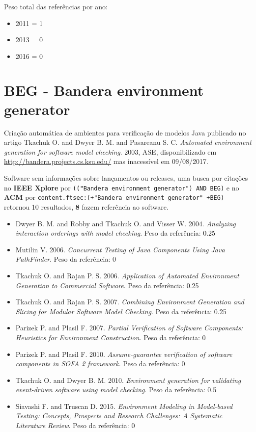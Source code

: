 Peso total das referências por ano:

\begin{itemize}
\item 2011 = 1
\item 2013 = 0
\item 2016 = 0
\end{itemize}


\section{BEG - Bandera environment generator}

Criação automática de ambientes para verificação de modelos Java
publicado no artigo
Tkachuk O. and Dwyer B. M. and Pasareanu S. C.
{\it Automated environment generation for software model checking}.
2003,
ASE,
disponibilizado em \url{http://bandera.projects.cs.ksu.edu/}
mas inacessível em 09/08/2017.

Software sem informações sobre lançamentos ou releases,
uma busca por citações no {\bf IEEE Xplore} por
\texttt{(("Bandera environment generator") AND BEG)}
e no {\bf ACM} por
\texttt{content.ftsec:(+"Bandera environment generator" +BEG)}
retornou
10 resultados,
{\bf 8} fazem referência ao software.

\begin{itemize}
\item Dwyer B. M. and Robby and Tkachuk O. and Visser W.
      2004.
      {\it Analyzing interaction orderings with model checking}.
      Peso da referência: 0.25
\item Mutilin V.
      2006.
      {\it Concurrent Testing of Java Components Using Java PathFinder}.
      Peso da referência: 0
\item Tkachuk O. and Rajan P. S.
      2006.
      {\it Application of Automated Environment Generation to Commercial Software}.
      Peso da referência: 0.25
\item Tkachuk O. and Rajan P. S.
      2007.
      {\it Combining Environment Generation and Slicing for Modular Software Model Checking}.
      Peso da referência: 0.25
\item Parizek P. and Plasil F.
      2007.
      {\it Partial Verification of Software Components: Heuristics for Environment Construction}.
      Peso da referência: 0
\item Parizek P. and Plasil F.
      2010.
      {\it Assume-guarantee verification of software components in SOFA 2 framework}.
      Peso da referência: 0
\item Tkachuk O. and Dwyer B. M.
      2010.
      {\it Environment generation for validating event-driven software using model checking}.
      Peso da referência: 0.5
\item Siavashi F. and Truscan D.
      2015.
      {\it Environment Modeling in Model-based Testing: Concepts, Prospects and Research Challenges: A Systematic Literature Review}.
      Peso da referência: 0
\end{itemize}

